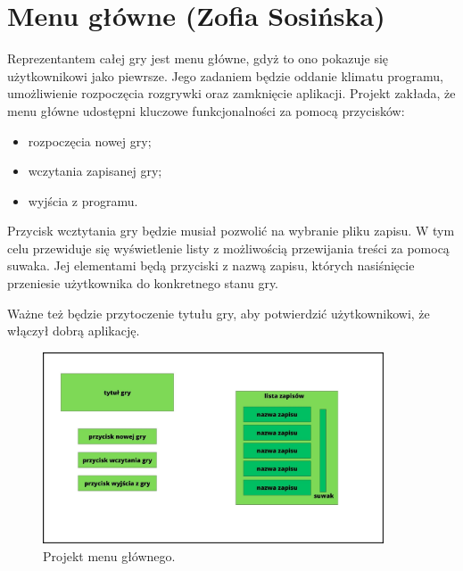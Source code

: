 \section{Menu główne (Zofia Sosińska)}\label{chap:menu_main}
Reprezentantem całej gry jest menu główne, gdyż to ono pokazuje się użytkownikowi jako piewrsze. Jego zadaniem będzie oddanie klimatu programu,
 umożliwienie rozpoczęcia rozgrywki oraz zamknięcie aplikacji.
Projekt zakłada, że menu główne udostępni kluczowe funkcjonalności za pomocą przycisków:
\begin{itemize}
    \item rozpoczęcia nowej gry;
    \item wczytania zapisanej gry;
    \item wyjścia z programu.
\end{itemize}

Przycisk wcztytania gry będzie musiał pozwolić na wybranie pliku zapisu. W tym celu przewiduje się wyświetlenie listy
z możliwością przewijania treści za pomocą suwaka. Jej elementami będą przyciski z nazwą zapisu, których nasiśnięcie przeniesie 
użytkownika do konkretnego stanu gry.

Ważne też będzie przytoczenie tytułu gry, aby potwierdzić użytkownikowi, że włączył dobrą aplikację.
\begin{figure}[htbp]
    \centering
    \includegraphics[width=0.9\textwidth]{images/ui/ui_prooj_menu.jpg}
    \caption{Projekt menu głównego.
    }\label{fig:compass}
\end{figure}